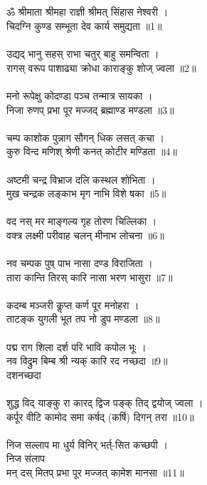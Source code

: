 \subsection{}
ॐ श्रीमाता श्रीमहा राज्ञी श्रीमत् सिंहास नेश्वरी ।\\
चिदग्नि कुण्ड सम्भूता देव कार्य समुद्यता ॥1॥\\
\\
उद्यद् भानु सहस् राभा चतुर् बाहु समन्विता ।\\
रागस् वरूप पाशाढ्या क्रोधा काराङ्कु शोज् ज्वला ॥2॥\\
\\
मनो रूपेक्षु कोदण्डा पञ्च तन्मात्र सायका ।\\
निजा रुणप् प्रभा पूर मज्जद् ब्रह्माण्ड मण्डला ॥3॥\\
\\
चम्प काशोक पुन्नाग सौगन् धिक लसत् कचा ।\\
कुरु विन्द मणिश् श्रेणी कनत् कोटीर मण्डिता ॥4॥\\
\\
अष्टमी चन्द्र विभ्राज दलि कस्थल शोभिता ।\\
मुख चन्द्रक लङ्काभ मृग नाभि विशे षका ॥5॥\\
\\
वद नस् मर माङ्गल्य गृह तोरण चिल्लिका ।\\
वक्त्र लक्ष्मी परीवाह चलन् मीनाभ लोचना ॥6॥\\
\\
नव चम्पक पुष् पाभ नासा दण्ड विराजिता ।\\
तारा कान्ति तिरस् कारि नासा भरण भासुरा ॥7॥\\
\\
कदम्ब मञ्जरी कॢप्त कर्ण पूर मनोहरा ।\\
ताटङ्क युगली भूत तप नो डुप मण्डला ॥8॥\\
\\
पद्म राग शिला दर्श परि भावि कपोल भूः ।\\
नव विद्रुम बिम्ब श्री न्यक् कारि रद नच्छदा ॥9॥\\
{\small{} दशनच्छदा}\\
\\
शुद्ध विद् याङ्कु रा कारद् द्विज पङ्क् तिद् द्वयोज् ज्वला ।\\
कर्पूर वीटि कामोद समा कर्षद् (कर्षि) दिगन् तरा ॥10॥\\
\\
निज सल्लाप मा धुर्य विनिर् भर्त्-सित कच्छपी । \\
{\small{} निज संलाप}\\
मन् दस् मितप् प्रभा पूर मज्जत् कामेश मानसा ॥11॥\\
